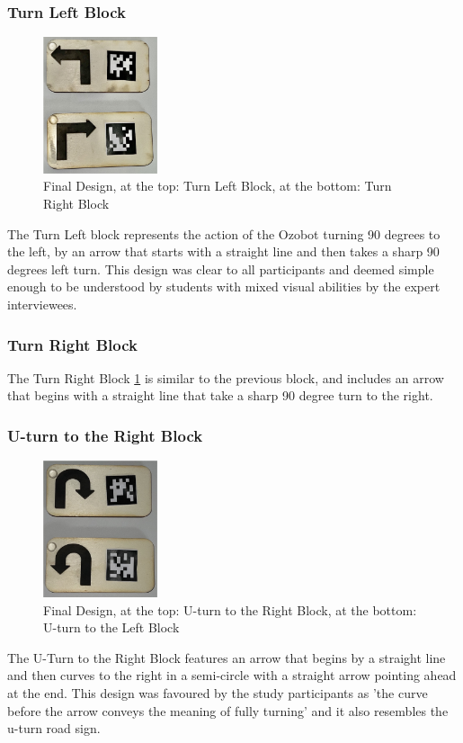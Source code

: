 \documentclass[oneside,%
                    author={Malak Hajji},
                    degree={BSc},
                    title={Designing An Accessible Ozobot Programming Platform for Students},
                  subtitle={With Mixed Visual Abilities}]{dissertation}
\begin{document}
\subsubsection{Turn Left Block}
\FloatBarrier
\begin{figure}[h]
    \centering
    \includegraphics[width=0.3\textwidth]{thesis/leftright.eps}
    \caption{Final Design, at the top: Turn Left Block, at the bottom: Turn Right Block}
    \label{fig-leftright}
\end{figure}
\FloatBarrier
The Turn Left block represents the action of the Ozobot turning 90 degrees to the left, by an arrow that starts with a straight line and then takes a sharp 90 degrees left turn. This design was clear to all participants and deemed simple enough to be understood by students with mixed visual abilities by the expert interviewees.

\subsubsection{Turn Right Block}
The Turn Right Block \ref{fig-leftright} is similar to the previous block, and includes an arrow that begins with a straight line that take a sharp 90 degree turn to the right.

\subsubsection{U-turn to the Right Block}
\FloatBarrier
\begin{figure}[h]
    \centering
    \includegraphics[width=0.3\textwidth]{thesis/tuurn.eps}
    \caption{Final Design, at the top: U-turn to the Right Block, at the bottom: U-turn to the Left Block}
    \label{fig-alluturns}
\end{figure}
\FloatBarrier
The U-Turn to the Right Block features an arrow that begins by a straight line and then curves to the right in a semi-circle with a straight arrow pointing ahead at the end. This design was favoured by the study  participants as 'the curve before the arrow conveys the meaning of fully turning' and it also resembles the u-turn road sign.
\end{document}
